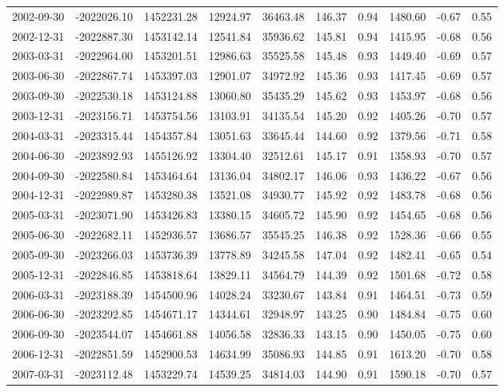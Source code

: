 \begin{landscape}
\begin{longtable}{llllllllll}
2002-09-30 & -2022026.10 & 1452231.28 & 12924.97 & 36463.48 & 146.37 & 0.94 & 1480.60 & -0.67 & 0.55 \\
2002-12-31 & -2022887.30 & 1453142.14 & 12541.84 & 35936.62 & 145.81 & 0.94 & 1415.95 & -0.68 & 0.56 \\
2003-03-31 & -2022964.00 & 1453201.51 & 12986.63 & 35525.58 & 145.48 & 0.93 & 1449.40 & -0.69 & 0.57 \\
2003-06-30 & -2022867.74 & 1453397.03 & 12901.07 & 34972.92 & 145.36 & 0.93 & 1417.45 & -0.69 & 0.57 \\
2003-09-30 & -2022530.18 & 1453124.88 & 13060.80 & 35435.29 & 145.62 & 0.93 & 1453.97 & -0.68 & 0.56 \\
2003-12-31 & -2023156.71 & 1453754.56 & 13103.91 & 34135.54 & 145.20 & 0.92 & 1405.26 & -0.70 & 0.57 \\
2004-03-31 & -2023315.44 & 1454357.84 & 13051.63 & 33645.44 & 144.60 & 0.92 & 1379.56 & -0.71 & 0.58 \\
2004-06-30 & -2023892.93 & 1455126.92 & 13304.40 & 32512.61 & 145.17 & 0.91 & 1358.93 & -0.70 & 0.57 \\
2004-09-30 & -2022580.84 & 1453464.64 & 13136.04 & 34802.17 & 146.06 & 0.93 & 1436.22 & -0.67 & 0.56 \\
2004-12-31 & -2022989.87 & 1453280.38 & 13521.08 & 34930.77 & 145.92 & 0.92 & 1483.78 & -0.68 & 0.56 \\
2005-03-31 & -2023071.90 & 1453426.83 & 13380.15 & 34605.72 & 145.90 & 0.92 & 1454.65 & -0.68 & 0.56 \\
2005-06-30 & -2022682.11 & 1452936.57 & 13686.57 & 35545.25 & 146.38 & 0.92 & 1528.36 & -0.66 & 0.55 \\
2005-09-30 & -2023266.03 & 1453736.39 & 13778.89 & 34245.58 & 147.04 & 0.92 & 1482.41 & -0.65 & 0.54 \\
2005-12-31 & -2022846.85 & 1453818.64 & 13829.11 & 34564.79 & 144.39 & 0.92 & 1501.68 & -0.72 & 0.58 \\
2006-03-31 & -2023188.39 & 1454500.96 & 14028.24 & 33230.67 & 143.84 & 0.91 & 1464.51 & -0.73 & 0.59 \\
2006-06-30 & -2023292.85 & 1454671.17 & 14344.61 & 32948.97 & 143.25 & 0.90 & 1484.84 & -0.75 & 0.60 \\
2006-09-30 & -2023544.07 & 1454661.88 & 14056.58 & 32836.33 & 143.15 & 0.90 & 1450.05 & -0.75 & 0.60 \\
2006-12-31 & -2022851.59 & 1452900.53 & 14634.99 & 35086.93 & 144.85 & 0.91 & 1613.20 & -0.70 & 0.58 \\
2007-03-31 & -2023112.48 & 1453229.74 & 14539.25 & 34814.03 & 144.90 & 0.91 & 1590.18 & -0.70 & 0.57 \\

\end{longtable}
\end{landscape}
